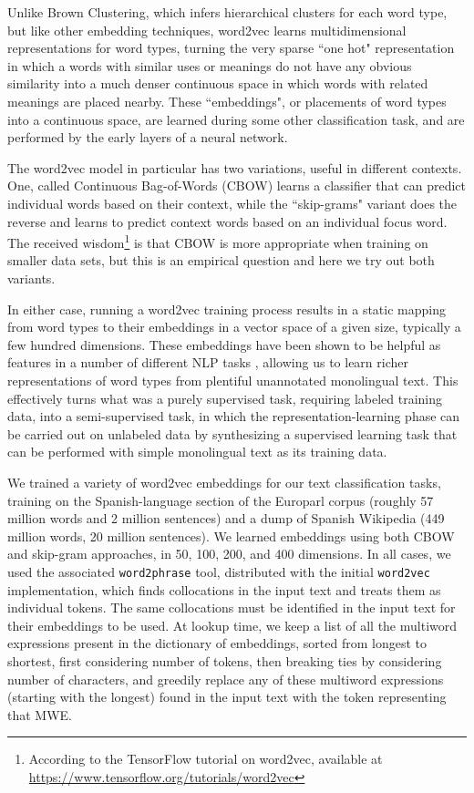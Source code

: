 Unlike Brown Clustering, which infers hierarchical clusters for each word type,
but like other embedding techniques, word2vec learns multidimensional
representations for word types, turning the very sparse ``one hot"
representation in which a words with similar uses or meanings do not have any
obvious similarity into a much denser continuous space in which words with
related meanings are placed nearby. These ``embeddings", or placements of word
types into a continuous space, are learned during some other classification
task, and are performed by the early layers of a neural network.

The word2vec model in particular has two variations, useful in different
contexts. One, called Continuous Bag-of-Words (CBOW) learns a classifier that
can predict individual words based on their context, while the ``skip-grams"
variant does the reverse and learns to predict context words based on an
individual focus word. The received wisdom\footnote{According to the TensorFlow
tutorial on word2vec, available at
\url{https://www.tensorflow.org/tutorials/word2vec}} is that CBOW is more
appropriate when training on smaller data sets, but this is an empirical
question and here we try out both variants.

In either case, running a word2vec training process results in a static mapping
from word types to their embeddings in a vector space of a given size,
typically a few hundred dimensions. These embeddings have been shown to be
helpful as features in a number of different NLP tasks \cite{baroni2014don},
allowing us to learn richer representations of word types from plentiful
unannotated monolingual text. This effectively turns what was a purely
supervised task, requiring labeled training data, into a semi-supervised task,
in which the representation-learning phase can be carried out on unlabeled data
by synthesizing a supervised learning task that can be performed with simple
monolingual text as its training data.

We trained a variety of word2vec embeddings for our text classification tasks,
training on the Spanish-language section of the Europarl corpus (roughly 57
million words and 2 million sentences) and a dump of Spanish Wikipedia (449
million words, 20 million sentences). We learned embeddings using both CBOW and
skip-gram approaches, in 50, 100, 200, and 400 dimensions. In all cases, we
used the associated \texttt{word2phrase} tool, distributed with the initial
\texttt{word2vec} implementation, which finds collocations in the input text
and treats them as individual tokens. The same collocations must be identified
in the input text for their embeddings to be used. At lookup time, we keep a
list of all the multiword expressions present in the dictionary of embeddings,
sorted from longest to shortest, first considering number of tokens, then
breaking ties by considering number of characters, and greedily replace any of
these multiword expressions (starting with the longest) found in the input text
with the token representing that MWE.

